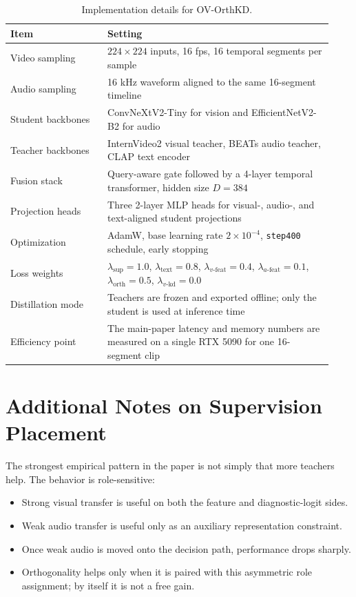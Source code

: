 \documentclass[11pt]{article}
\begin{document}
\begin{table}[ht]
    \centering
    \caption{Implementation details for OV-OrthKD.}
    \label{tab:supp_impl}
    \begin{tabular}{@{}p{0.28\linewidth}p{0.65\linewidth}@{}}
        \toprule
        Item & Setting \\
        \midrule
        Video sampling & $224 \times 224$ inputs, 16 fps, 16 temporal segments per sample \\
        Audio sampling & 16 kHz waveform aligned to the same 16-segment timeline \\
        Student backbones & ConvNeXtV2-Tiny for vision and EfficientNetV2-B2 for audio \\
        Teacher backbones & InternVideo2 visual teacher, BEATs audio teacher, CLAP text encoder \\
        Fusion stack & Query-aware gate followed by a 4-layer temporal transformer, hidden size $D=384$ \\
        Projection heads & Three 2-layer MLP heads for visual-, audio-, and text-aligned student projections \\
        Optimization & AdamW, base learning rate $2 \times 10^{-4}$, \texttt{step400} schedule, early stopping \\
        Loss weights & $\lambda_{\mathrm{sup}}=1.0$, $\lambda_{\mathrm{text}}=0.8$, $\lambda_{v\text{-feat}}=0.4$, $\lambda_{a\text{-feat}}=0.1$, $\lambda_{\mathrm{orth}}=0.5$, $\lambda_{v\text{-kd}}=0.0$ \\
        Distillation mode & Teachers are frozen and exported offline; only the student is used at inference time \\
        Efficiency point & The main-paper latency and memory numbers are measured on a single RTX 5090 for one 16-segment clip \\
        \bottomrule
    \end{tabular}
\end{table}

\section{Additional Notes on Supervision Placement}

The strongest empirical pattern in the paper is not simply that more teachers help. The behavior is role-sensitive:
\begin{itemize}
    \item Strong visual transfer is useful on both the feature and diagnostic-logit sides.
    \item Weak audio transfer is useful only as an auxiliary representation constraint.
    \item Once weak audio is moved onto the decision path, performance drops sharply.
    \item Orthogonality helps only when it is paired with this asymmetric role assignment; by itself it is not a free gain.
\end{itemize}
\end{document}

